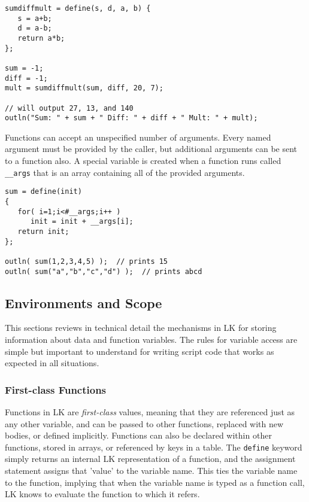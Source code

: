 \documentclass{article}
\begin{document}
\begin{verbatim}
sumdiffmult = define(s, d, a, b) {
   s = a+b;
   d = a-b;
   return a*b;
};

sum = -1;
diff = -1;
mult = sumdiffmult(sum, diff, 20, 7);

// will output 27, 13, and 140
outln("Sum: " + sum + " Diff: " + diff + " Mult: " + mult);
\end{verbatim}

Functions can accept an unspecified number of arguments.  Every named argument must be provided by the caller, but additional arguments can be sent to a function also.  A special variable is created when a function runs called \texttt{\_\_args} that is an array containing all of the provided arguments.

\begin{verbatim}
sum = define(init)
{
   for( i=1;i<#__args;i++ )
      init = init + __args[i];
   return init;
};

outln( sum(1,2,3,4,5) );  // prints 15
outln( sum("a","b","c","d") );  // prints abcd
\end{verbatim}

\subsection{Environments and Scope}

This sections reviews in technical detail the mechanisms in LK for storing information about data and function variables.  The rules for variable access are simple but important to understand for writing script code that works as expected in all situations.

\subsubsection{First-class Functions}

Functions in LK are \emph{first-class} values, meaning that they are referenced just as any other variable, and can be passed to other functions, replaced with new bodies, or defined implicitly.  Functions can also be declared within other functions, stored in arrays, or referenced by keys in a table.  The \texttt{define} keyword simply returns an internal LK representation of a function, and the assignment statement assigns that 'value' to the variable name.  This ties the variable name to the function, implying that when the variable name is typed as a function call, LK knows to evaluate the function to which it refers.
\end{document}
